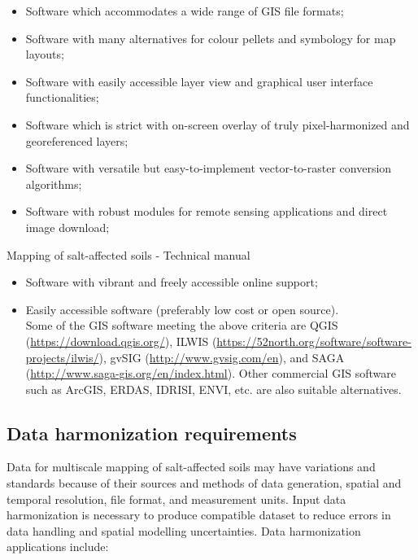 \documentclass[
  10pt,
  b5paper,
]{book}
\providecommand{\tightlist}{%
  \setlength{\itemsep}{0pt}\setlength{\parskip}{0pt}}
\begin{document}
\begin{itemize}
\tightlist
\item
  Software which accommodates a wide range of GIS file formats;\\
\item
  Software with many alternatives for colour pellets and symbology for map layouts;\\
\item
  Software with easily accessible layer view and graphical user interface functionalities;\\
\item
  Software which is strict with on-screen overlay of truly pixel-harmonized and georeferenced layers;\\
\item
  Software with versatile but easy-to-implement vector-to-raster conversion algorithms;\\
\item
  Software with robust modules for remote sensing applications and direct image download;
\end{itemize}

Mapping of salt-affected soils - Technical manual

\begin{itemize}
\tightlist
\item
  Software with vibrant and freely accessible online support;\\
\item
  Easily accessible software (preferably low cost or open source).\\
  Some of the GIS software meeting the above criteria are QGIS (\url{https://download.qgis.org/}), ILWIS (\url{https://52north.org/software/software-projects/ilwis/}), gvSIG (\url{http://www.gvsig.com/en}), and SAGA (\url{http://www.saga-gis.org/en/index.html}). Other commercial GIS software such as ArcGIS, ERDAS, IDRISI, ENVI, etc. are also suitable alternatives.
\end{itemize}

\hypertarget{data-harmonization-requirements}{%
\subsection{Data harmonization requirements}\label{data-harmonization-requirements}}

Data for multiscale mapping of salt-affected soils may have variations and standards because of their sources and methods of data generation, spatial and temporal resolution, file format, and measurement units. Input data harmonization is necessary to produce compatible dataset to reduce errors in data handling and spatial modelling uncertainties. Data harmonization applications include:
\end{document}
